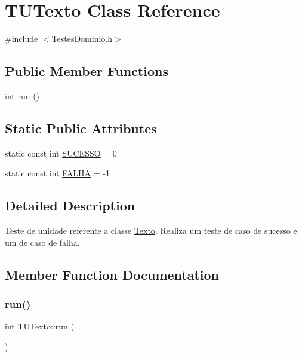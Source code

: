 \hypertarget{class_t_u_texto}{}\section{T\+U\+Texto Class Reference}
\label{class_t_u_texto}


{\ttfamily \#include $<$Testes\+Dominio.\+h$>$}

\subsection*{Public Member Functions}
\begin{DoxyCompactItemize}
\item 
int \hyperlink{class_t_u_texto_afd0ced06861f0e336ef7248f36b31e2c}{run} ()
\end{DoxyCompactItemize}
\subsection*{Static Public Attributes}
\begin{DoxyCompactItemize}
\item 
static const int \hyperlink{class_t_u_texto_a85843f1840647cc1c8dc2606fe03dc36}{S\+U\+C\+E\+S\+SO} = 0
\item 
static const int \hyperlink{class_t_u_texto_ad225db82ebc02a313957712dbc70abd2}{F\+A\+L\+HA} = -\/1
\end{DoxyCompactItemize}


\subsection{Detailed Description}
Teste de unidade referente a classe \hyperlink{class_texto}{Texto}. Realiza um teste de caso de sucesso e um de caso de falha. 

\subsection{Member Function Documentation}
\mbox{\label{class_t_u_texto_afd0ced06861f0e336ef7248f36b31e2c}} 
\subsubsection{\texorpdfstring{run()}{run()}}
{\footnotesize\ttfamily int T\+U\+Texto\+::run (\begin{DoxyParamCaption}{ }\end{DoxyParamCaption})}



